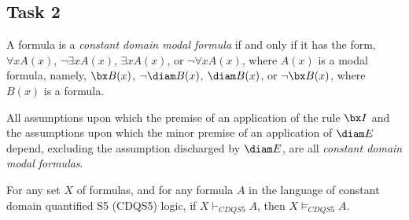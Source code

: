 \subsection*{Task 2}

\begin{definition}
A formula is a \textit{constant domain modal formula} if and only if it has the form, $\forall x A(x)$, $\neg \exists x A(x)$, $\exists x A(x)$, or $\neg \forall x A(x)$, where $A(x)$ is a modal formula, namely, $\bx B(x)$, $\neg \diam B(x)$, $\diam B(x)$, or $\neg \bx B(x)$, where $B(x)$ is a formula.
\end{definition}

\begin{definition}
All assumptions upon which the premise of an application of the rule $\bx I$ and the assumptions upon which the minor premise of an application of $\diam E$ depend, excluding the assumption discharged by $\diam E$, are all \textit{constant domain modal formulas}.
\end{definition}

\begin{theorem}[Soundness]
For any set $X$ of formulas, and for any formula $A$ in the language of constant domain quantified S5 (CDQS5) logic, if $X \vdash_{CDQS5} A$, then $X \vDash_{CDQS5} A$.
\end{theorem}

